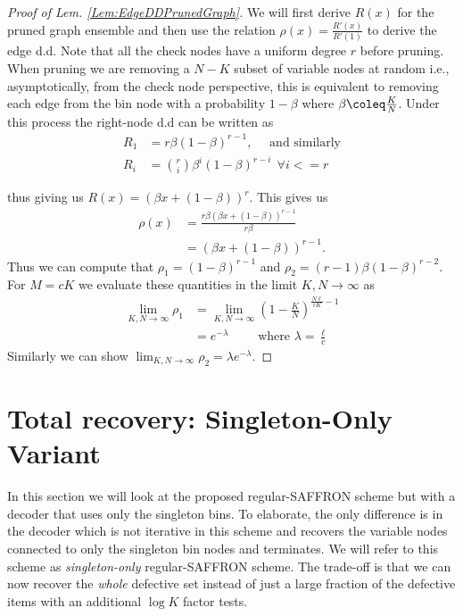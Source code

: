 \documentclass[conference,twocolumn]{IEEEtran}
\begin{document}
\begin{proof}[Proof of Lem. \ref{Lem:EdgeDDPrunedGraph}]
We will first derive $R(x)$ for the pruned graph ensemble and then use the relation $\rho(x)=\frac{R'(x)}{R'(1)}$\cite{richardson2008modern}  to derive the edge d.d. Note that all the check nodes have a uniform degree $r$ before pruning. When pruning we are removing a $N-K$ subset of variable nodes at random i.e., asymptotically, from the check node perspective, this is equivalent to removing each edge from the bin node with a probability $1-\beta$ where $\beta\coleq \frac{K}{N}$. Under this process the right-node d.d can be written as
\begin{align}
R_1&=r\beta(1-\beta)^{r-1},\quad \text{ and similarly}\label{Eqn:Deg1ChkDistribution}\\
R_i &=\binom{r}{i} \beta^{i}(1-\beta)^{r-i} ~~\forall i<=r \nonumber
\end{align}

thus giving us $R(x)=(\beta x+(1-\beta))^{r}$. This gives us 
\begin{align*}
\rho(x)&=\frac{r\beta(\beta x+(1-\beta))^{r-1}}{r\beta}\\
          &=(\beta x+(1-\beta))^{r-1}.
\end{align*}
Thus we can compute that $\rho_1=(1-\beta)^{r-1}$ and $\rho_2=(r-1)\beta(1-\beta)^{r-2}$. For $M=c K$ we evaluate these quantities in the limit $K,N\rightarrow \infty$ as
\begin{align*}
\lim_{K,N\rightarrow \infty} \rho_1&=\lim_{K,N\rightarrow \infty} \left(1-\frac{K}{N}\right)^{\frac{N\ell}{c K}-1}\\
&=e^{-\lambda} \qquad \text{ where } \lambda=\frac{\ell}{c}
\end{align*}
Similarly we can show $\lim_{K,N\rightarrow \infty}\rho_2=\lambda e^{-\lambda}$.
\end{proof}


\section{Total recovery: Singleton-Only Variant}
In this section we will look at the proposed regular-SAFFRON scheme but with a decoder that uses only the singleton bins. To elaborate, the only difference is in the decoder which is not iterative in this scheme and recovers the variable nodes connected to only the singleton bin nodes and terminates. We will refer to this scheme as \textit{singleton-only} regular-SAFFRON scheme. The trade-off is that we can now recover the \textit{whole} defective set instead of just a large fraction of the defective items with an additional $\log K$ factor tests.
\end{document}
